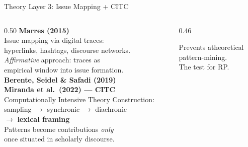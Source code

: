 \documentclass[aspectratio=169,12pt]{beamer}
\begin{document}
\begin{frame}{Theory Layer 3: Issue Mapping + CITC}
\begin{columns}[T]
\begin{column}{0.50\textwidth}
  \textbf{Marres (2015)}\\
  \footnotesize
  Issue mapping via digital traces:\\
  hyperlinks, hashtags, discourse networks.\\
  \textit{Affirmative} approach: traces as\\
  empirical window into issue formation.\\[0.5em]

  \textbf{Berente, Seidel \& Safadi (2019)\\
  Miranda et al.\ (2022) — CITC}\\[0.2em]
  \footnotesize
  Computationally Intensive Theory Construction:\\
  sampling $\to$ synchronic $\to$ diachronic\\
  $\to$ \textbf{lexical framing}\\[0.3em]
  Patterns become contributions \textit{only}\\
  once situated in scholarly discourse.
\end{column}
\begin{column}{0.46\textwidth}
  \vspace{0.5em}
  \vspace{0.4em}

  \footnotesize\textcolor{tufteRule}{Prevents atheoretical\\
  pattern-mining.\\
  The test for RP.}
\end{column}
\end{columns}
\end{frame}
\end{document}
